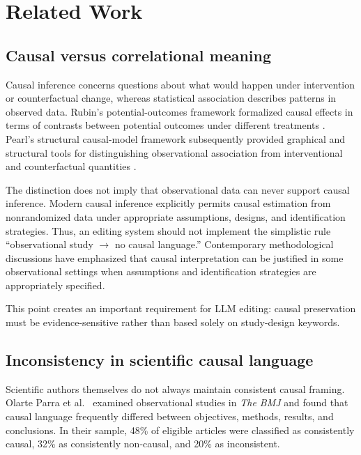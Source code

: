 \documentclass[11pt]{article}
\begin{document}
\section{Related Work}
\label{sec:related-work}

\subsection{Causal versus correlational meaning}

Causal inference concerns questions about what would happen under intervention or counterfactual change, whereas statistical association describes patterns in observed data. Rubin's potential-outcomes framework formalized causal effects in terms of contrasts between potential outcomes under different treatments \cite{rubin1974}. Pearl's structural causal-model framework subsequently provided graphical and structural tools for distinguishing observational association from interventional and counterfactual quantities \cite{pearl2009}.

The distinction does not imply that observational data can never support causal inference. Modern causal inference explicitly permits causal estimation from nonrandomized data under appropriate assumptions, designs, and identification strategies. Thus, an editing system should not implement the simplistic rule ``observational study $\rightarrow$ no causal language.'' Contemporary methodological discussions have emphasized that causal interpretation can be justified in some observational settings when assumptions and identification strategies are appropriately specified.

This point creates an important requirement for LLM editing: causal preservation must be evidence-sensitive rather than based solely on study-design keywords.

\subsection{Inconsistency in scientific causal language}
\label{sec:causal-language-inconsistency}

Scientific authors themselves do not always maintain consistent causal framing. Olarte Parra et al.~\cite{olarteparra2021} examined observational studies in \textit{The BMJ} and found that causal language frequently differed between objectives, methods, results, and conclusions. In their sample, 48\% of eligible articles were classified as consistently causal, 32\% as consistently non-causal, and 20\% as inconsistent.
\end{document}
